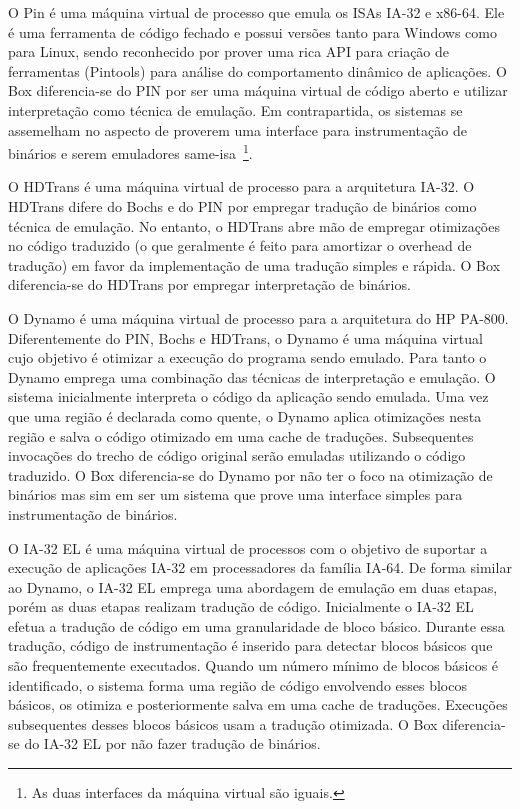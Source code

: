 \documentclass[11pt,twoside]{article}
\begin{document}
O Pin \cite{pin} é uma máquina virtual de processo que emula os ISAs IA-32
e x86-64. Ele é uma ferramenta de código fechado e possui versões tanto
para Windows como para Linux, sendo reconhecido por prover uma rica
API para criação de ferramentas (Pintools) para análise do comportamento 
dinâmico de aplicações. O Box diferencia-se do PIN por ser uma máquina
virtual de código aberto e utilizar interpretação como técnica de emulação.
Em contrapartida, os sistemas se assemelham no aspecto de proverem uma
interface para instrumentação de binários e serem emuladores same-isa~\footnote{As duas interfaces da máquina virtual são iguais.}.

O HDTrans \cite{hdtrans} é uma máquina virtual de processo para
a arquitetura IA-32. O HDTrans difere do Bochs e do PIN por empregar tradução
de binários como técnica de emulação. No entanto, o HDTrans abre mão de 
empregar otimizações no código traduzido (o que geralmente é feito para 
amortizar o overhead de tradução) em favor da implementação de uma tradução
simples e rápida. O Box diferencia-se do HDTrans por empregar interpretação 
de binários.

O Dynamo \cite{dynamo} é uma máquina virtual de processo para a arquitetura
do HP PA-800. Diferentemente do PIN, Bochs e HDTrans, o Dynamo é uma máquina
virtual cujo objetivo é otimizar a execução do programa sendo emulado.
Para tanto o Dynamo emprega uma combinação das técnicas de interpretação
e emulação. O sistema inicialmente interpreta o código da aplicação sendo 
emulada. Uma vez que uma região é declarada como quente, o Dynamo aplica 
otimizações nesta região e salva o código otimizado em uma cache de traduções. 
Subsequentes invocações do trecho de código original serão emuladas utilizando 
o código traduzido. O Box diferencia-se do Dynamo por não ter o foco na otimização 
de binários mas sim em ser um sistema que prove uma interface simples para 
instrumentação de binários.

O IA-32 EL \cite{ia32el} é uma máquina virtual de processos com o objetivo de
suportar a execução de aplicações IA-32 em processadores da família IA-64.
De forma similar ao Dynamo, o IA-32 EL emprega uma abordagem de emulação em
duas etapas, porém as duas etapas realizam tradução de código. Inicialmente
o IA-32 EL efetua a tradução de código em uma granularidade de bloco básico.
Durante essa tradução, código de instrumentação é inserido para detectar blocos
básicos que são frequentemente executados. Quando um número mínimo de blocos básicos
é identificado, o sistema forma uma região de código envolvendo esses blocos
básicos, os otimiza e posteriormente salva em uma cache de traduções. Execuções
subsequentes desses blocos básicos usam a tradução otimizada. O Box diferencia-se 
do IA-32 EL por não fazer tradução de binários.
\end{document}
